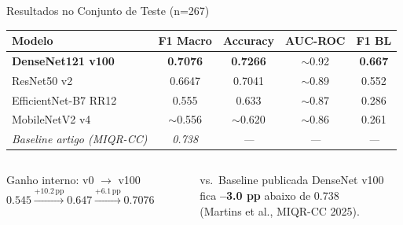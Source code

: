 \documentclass[aspectratio=169]{beamer}
\begin{document}
\begin{frame}{Resultados no Conjunto de Teste (n=267)}
  \begin{center}
    \begin{tabular}{lcccc}
      \toprule
      Modelo & F1 Macro & Accuracy & AUC-ROC & F1 BL\\
      \midrule
      \rowcolor{umred!15}
      \alert{\textbf{DenseNet121 v100}} &
        \alert{\textbf{0.7076}} & \alert{\textbf{0.7266}} &
        $\sim$0.92 & \alert{\textbf{0.667}}\\
      ResNet50 v2    & 0.6647 & 0.7041 & $\sim$0.89 & 0.552\\
      EfficientNet-B7 RR12 & 0.555 & 0.633  & $\sim$0.87 & 0.286\\
      MobileNetV2 v4 & $\sim$0.556 & $\sim$0.620 & $\sim$0.86 & 0.261\\
      \midrule
      \textit{Baseline artigo (MIQR-CC)} &
        \textit{0.738} & \textit{---} & \textit{---} & \textit{---}\\
      \bottomrule
    \end{tabular}
  \end{center}
  \vspace{0.4em}
  \begin{columns}
      \begin{block}{Ganho interno: v0 $\to$ v100}
        $0.545 \xrightarrow{+10.2\,\text{pp}} 0.647
         \xrightarrow{+6.1\,\text{pp}} \mathbf{0.7076}$
      \end{block}
      \begin{alertblock}{vs.\ Baseline publicada}
        DenseNet v100 fica \textbf{--3.0 pp} abaixo de 0.738\\
        (Martins et al., MIQR-CC 2025).
      \end{alertblock}
  \end{columns}
\end{frame}
\end{document}
